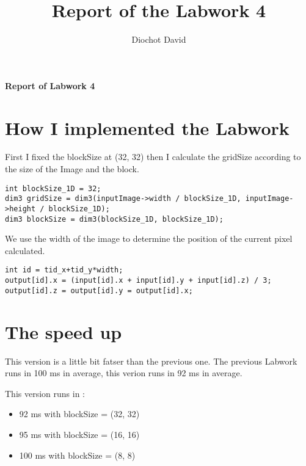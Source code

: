 \documentclass[a4paper]{article}
\title{Report of the Labwork 4}
\author{Diochot David}
\begin{document}
\begin{center}
    { \huge \bfseries Report of Labwork 4 \\[0.4cm] }
\end{center}


\section{How I implemented the Labwork}  

First I fixed the blockSize at (32, 32) then I calculate the gridSize according to the size of the Image and 
the block.

\begin{verbatim}
int blockSize_1D = 32;
dim3 gridSize = dim3(inputImage->width / blockSize_1D, inputImage->height / blockSize_1D);
dim3 blockSize = dim3(blockSize_1D, blockSize_1D);
\end{verbatim}

We use the width of the image to determine the position of the current pixel calculated.

\begin{verbatim}
int id = tid_x+tid_y*width;
output[id].x = (input[id].x + input[id].y + input[id].z) / 3;
output[id].z = output[id].y = output[id].x;
\end{verbatim}


\section{The speed up}

This version is a little bit fatser than the previous one. The previous Labwork runs in 100 ms in average,
this verion runs in 92 ms in average.

This version runs in : \\
\begin{itemize}
    \item 92 ms with blockSize = (32, 32)
    \item 95 ms with blockSize = (16, 16)
    \item 100 ms with blockSize = (8, 8)
\end{itemize}
    
\end{document}
